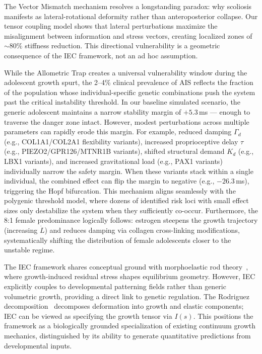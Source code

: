 \documentclass[11pt]{article}
\begin{document}
The Vector Mismatch mechanism resolves a longstanding paradox: why scoliosis manifests as lateral-rotational deformity rather than anteroposterior collapse. Our tensor coupling model shows that lateral perturbations maximize the misalignment between information and stress vectors, creating localized zones of ${\sim}80\%$ stiffness reduction. This directional vulnerability is a geometric consequence of the IEC framework, not an ad hoc assumption.



While the Allometric Trap creates a universal vulnerability window during the adolescent growth spurt, the 2--4\% clinical prevalence of AIS reflects the fraction of the population whose individual-specific genetic combinations push the system past the critical instability threshold. In our baseline simulated scenario, the generic adolescent maintains a narrow stability margin of $+5.3$\,ms --- enough to traverse the danger zone intact. However, modest perturbations across multiple parameters can rapidly erode this margin. For example, reduced damping $\Gamma_d$ (e.g., COL1A1/COL2A1 flexibility variants), increased proprioceptive delay $\tau$ (e.g., PIEZO2/GPR126/MTNR1B variants), shifted structural demand $K_d$ (e.g., LBX1 variants), and increased gravitational load (e.g., PAX1 variants) individually narrow the safety margin. When these variants stack within a single individual, the combined effect can flip the margin to negative (e.g., $-26.3$\,ms), triggering the Hopf bifurcation. This mechanism aligns seamlessly with the polygenic threshold model, where dozens of identified risk loci with small effect sizes only destabilize the system when they sufficiently co-occur. Furthermore, the 8:1 female predominance logically follows: estrogen steepens the growth trajectory (increasing $\dot{L}$) and reduces damping via collagen cross-linking modifications, systematically shifting the distribution of female adolescents closer to the unstable regime.



The IEC framework shares conceptual ground with morphoelastic rod theory~\cite{moulton2013morphoelastic}, where growth-induced residual stress shapes equilibrium geometry. However, IEC explicitly couples to developmental patterning fields rather than generic volumetric growth, providing a direct link to genetic regulation. The Rodriguez decomposition~\cite{rodriguez1994stress} decomposes deformation into growth and elastic components; IEC can be viewed as specifying the growth tensor via $I(s)$. This positions the framework as a biologically grounded specialization of existing continuum growth mechanics, distinguished by its ability to generate quantitative predictions from developmental inputs.
\end{document}
